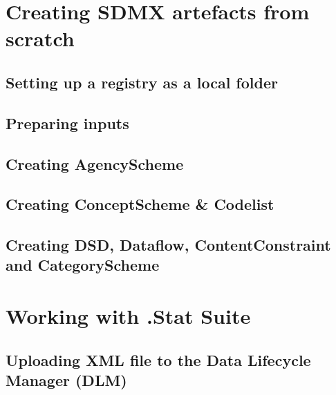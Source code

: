 \documentclass[
]{book}
\theoremstyle{definition}
\theoremstyle{definition}
\theoremstyle{definition}
\theoremstyle{definition}
\theoremstyle{remark}
\begin{document}
\hypertarget{creating-sdmx-artefacts-from-scratch}{%
\section{Creating SDMX artefacts from scratch}\label{creating-sdmx-artefacts-from-scratch}}

\hypertarget{setting-up-a-registry-as-a-local-folder}{%
\subsection{Setting up a registry as a local folder}\label{setting-up-a-registry-as-a-local-folder}}

\hypertarget{preparing-inputs}{%
\subsection{Preparing inputs}\label{preparing-inputs}}

\hypertarget{creating-agencyscheme}{%
\subsection{Creating AgencyScheme}\label{creating-agencyscheme}}

\hypertarget{creating-conceptscheme-codelist}{%
\subsection{Creating ConceptScheme \& Codelist}\label{creating-conceptscheme-codelist}}

\hypertarget{creating-dsd-dataflow-contentconstraint-and-categoryscheme}{%
\subsection{Creating DSD, Dataflow, ContentConstraint and CategoryScheme}\label{creating-dsd-dataflow-contentconstraint-and-categoryscheme}}

\hypertarget{working-with-.stat-suite}{%
\section{Working with .Stat Suite}\label{working-with-.stat-suite}}

\hypertarget{uploading-xml-file-to-the-data-lifecycle-manager-dlm}{%
\subsection{Uploading XML file to the Data Lifecycle Manager (DLM)}\label{uploading-xml-file-to-the-data-lifecycle-manager-dlm}}
\end{document}
